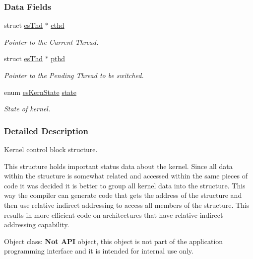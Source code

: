 \subsubsection*{Data Fields}
\begin{DoxyCompactItemize}
\item 
struct \hyperlink{structesThd}{es\-Thd} $\ast$ \hyperlink{structkernCtrl___ada8492a441474dd8243f9b3d6440b931}{cthd}
\begin{DoxyCompactList}\small\item\em Pointer to the Current Thread. \end{DoxyCompactList}\item 
struct \hyperlink{structesThd}{es\-Thd} $\ast$ \hyperlink{structkernCtrl___aba053a184d6eedce8df1788a0ca5955e}{pthd}
\begin{DoxyCompactList}\small\item\em Pointer to the Pending Thread to be switched. \end{DoxyCompactList}\item 
enum \hyperlink{group__kern__ctrl_gac9be6bfeddbd6af148cdb3867fbc24af}{es\-Kern\-State} \hyperlink{structkernCtrl___af9186609ce09f0a53278e95ccd5c36ec}{state}
\begin{DoxyCompactList}\small\item\em State of kernel. \end{DoxyCompactList}\end{DoxyCompactItemize}


\subsubsection{Detailed Description}
Kernel control block structure. 

This structure holds important status data about the kernel. Since all data within the structure is somewhat related and accessed within the same pieces of code it was decided it is better to group all kernel data into the structure. This way the compiler can generate code that gets the address of the structure and then use relative indirect addressing to access all members of the structure. This results in more efficient code on architectures that have relative indirect addressing capability. \begin{DoxyParagraph}{Object class\-:}
{\bfseries Not A\-P\-I} object, this object is not part of the application programming interface and it is intended for internal use only. 
\end{DoxyParagraph}


